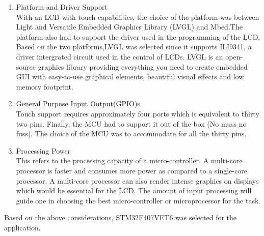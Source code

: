 \begin{enumerate}
    \item Platform and Driver Support \\
    With an LCD with touch capabilities, the choice of the platform was between Light and Versatile Embedded Graphics Library (LVGL) and Mbed.The platform also had to support the driver used in the programming of the LCD. Based on the two platforms,LVGL was selected since it supports ILI9341, a driver intergrated circuit used in the control of LCDs. LVGL is an open-source graphics library providing everything you need to create embedded GUI with easy-to-use graphical elements, beautiful visual effects and low memory footprint.
    \item General Purpose Input Output(GPIO)s \\
    Touch support requires approximately four ports which is equivalent to thirty two pins. Finally, the MCU had to support it out of the box (No muss no fuss). The choice of the MCU was to accommodate for all the thirty pins.
    \item Processing Power \\
    This refers to the processing capacity of a micro-controller. A multi-core processor is faster and consumes more power as compared to a single-core processor. A multi-core processor can also render intense graphics on displays which would be essential for the LCD. The amount of input processing will guide one in choosing the best micro-controller or microprocessor for the task.
\end{enumerate}
Based on the above considerations, STM32F407VET6 was selected for the application.

